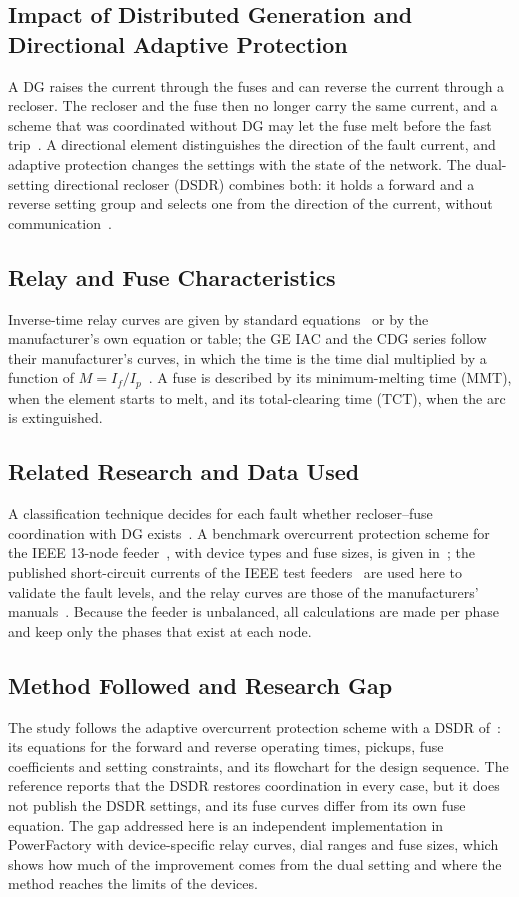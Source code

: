 \documentclass[12pt,a4paper]{article}
\newcommand{\PF}{PowerFactory}
\begin{document}
\subsection{Impact of Distributed Generation and Directional Adaptive Protection}
A DG raises the current through the fuses and can reverse the current through a recloser. The recloser and the
fuse then no longer carry the same current, and a scheme that was coordinated without DG may let the fuse melt
before the fast trip~\cite{naiem2012}. A directional element distinguishes the direction of the fault current,
and adaptive protection changes the settings with the state of the network. The dual-setting directional
recloser (DSDR) combines both: it holds a forward and a reverse setting group and selects one from the
direction of the current, without communication~\cite{yousaf2022}.

\subsection{Relay and Fuse Characteristics}
Inverse-time relay curves are given by standard equations~\cite{benmouyal1999} or by the manufacturer's own
equation or table; the GE IAC and the CDG series follow their manufacturer's curves, in which the time is the time
dial multiplied by a function of $M = I_f/I_p$~\cite{gemultilin}. A fuse is described by its minimum-melting time
(MMT), when the element starts to melt, and its total-clearing time (TCT), when the arc is extinguished.

\subsection{Related Research and Data Used}
A classification technique decides for each fault whether recloser--fuse coordination with DG
exists~\cite{naiem2012}. A benchmark overcurrent protection scheme for the IEEE 13-node feeder~\cite{kersting1991},
with device types and fuse sizes, is given in~\cite{yousaf2020}; the published short-circuit currents of the
IEEE test feeders~\cite{kersting2012} are used here to validate the fault levels, and the relay curves are those
of the manufacturers' manuals~\cite{gemultilin}. Because the feeder is unbalanced, all calculations are made per
phase and keep only the phases that exist at each node.

\subsection{Method Followed and Research Gap}
The study follows the adaptive overcurrent protection scheme with a DSDR of~\cite{yousaf2022}: its equations for
the forward and reverse operating times, pickups, fuse coefficients and setting constraints, and its flowchart
for the design sequence. The reference reports that the DSDR restores coordination in every case, but it does
not publish the DSDR settings, and its fuse curves differ from its own fuse equation. The gap addressed here is
an independent implementation in \PF{} with device-specific relay curves, dial ranges and fuse sizes, which shows how
much of the improvement comes from the dual setting and where the method reaches the limits of the devices.
\end{document}
